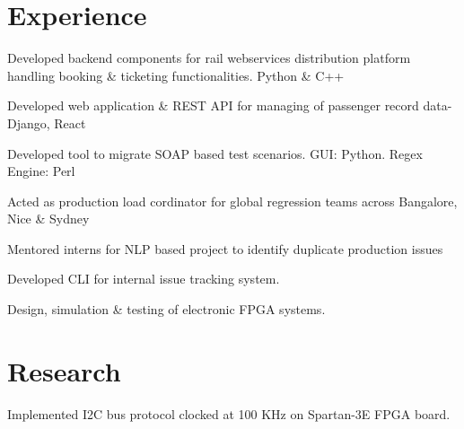 \documentclass[]{Resume_Piyush}
\begin{document}
\begin{minipage}[t]{0.66\textwidth} 


\section{Experience}

\vspace{\topsep} %
\begin{tightemize}
\item Developed backend components for rail webservices distribution platform handling booking \& ticketing functionalities. Python \& C++
\item Developed web application \& REST API for managing of passenger record data- Django, React
\item Developed tool to migrate SOAP based test scenarios. GUI: Python. Regex Engine: Perl 
\item Acted as production load cordinator for global regression teams across Bangalore, Nice \& Sydney
\item Mentored interns for NLP based project to identify duplicate production issues
\end{tightemize}
\sectionsep

\begin{tightemize}
\item Developed CLI for internal issue tracking system.
\end{tightemize}
\sectionsep

\begin{tightemize}
\item Design, simulation \& testing of electronic FPGA systems.
\end{tightemize}
\sectionsep


\section{Research}
Implemented I2C bus protocol clocked at 100 KHz on Spartan-3E FPGA board. 


\end{minipage}
\end{document}
